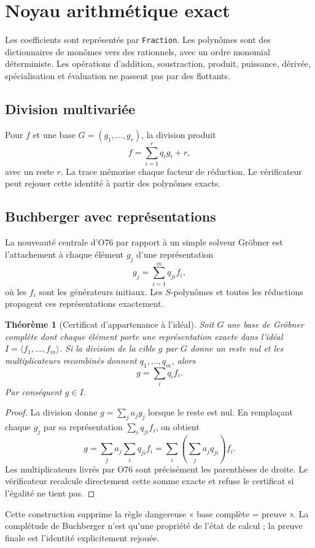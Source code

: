 \documentclass[11pt,a4paper]{article}
\newtheorem{theorem}{Théorème}[section]
\begin{document}
\section{Noyau arithmétique exact}
Les coefficients sont représentés par \texttt{Fraction}. Les polynômes sont des dictionnaires de monômes vers des rationnels, avec un ordre monomial déterministe. Les opérations d'addition, soustraction, produit, puissance, dérivée, spécialisation et évaluation ne passent pas par des flottants.

\subsection{Division multivariée}
Pour $f$ et une base $G=(g_1,\dots,g_r)$, la division produit
\[
f=\sum_{i=1}^r q_i g_i+r,
\]
avec un reste $r$. La trace mémorise chaque facteur de réduction. Le vérificateur peut rejouer cette identité à partir des polynômes exacts.

\subsection{Buchberger avec représentations}
La nouveauté centrale d'O76 par rapport à un simple solveur Gröbner est l'attachement à chaque élément $g_j$ d'une représentation
\[
g_j=\sum_{i=1}^{m} q_{ji} f_i,
\]
où les $f_i$ sont les générateurs initiaux. Les $S$-polynômes et toutes les réductions propagent ces représentations exactement.

\begin{theorem}[Certificat d'appartenance à l'idéal]
Soit $G$ une base de Gröbner complète dont chaque élément porte une représentation exacte dans l'idéal $I=\langle f_1,\ldots,f_m\rangle$. Si la division de la cible $g$ par $G$ donne un reste nul et les multiplicateurs recombinés donnent $q_1,\ldots,q_m$, alors
\[
g=\sum_i q_i f_i.
\]
Par conséquent $g\in I$.
\end{theorem}
\begin{proof}
La division donne $g=\sum_j a_jg_j$ lorsque le reste est nul. En remplaçant chaque $g_j$ par sa représentation $\sum_i q_{ji}f_i$, on obtient
\[
g=\sum_j a_j\sum_i q_{ji}f_i=\sum_i\left(\sum_j a_jq_{ji}\right)f_i.
\]
Les multiplicateurs livrés par O76 sont précisément les parenthèses de droite. Le vérificateur recalcule directement cette somme exacte et refuse le certificat si l'égalité ne tient pas.
\end{proof}

Cette construction supprime la règle dangereuse « base complète = preuve ». La complétude de Buchberger n'est qu'une propriété de l'état de calcul ; la preuve finale est l'identité explicitement rejouée.
\end{document}
